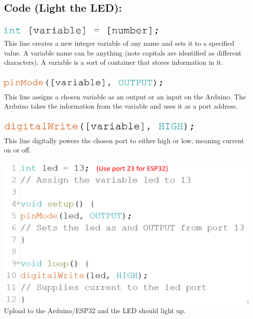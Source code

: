 \documentclass[a4paper,12pt]{report}
\newcommand{\diagramWidth}{150mm}
\newcommand{\codeHeight}{7mm}
\begin{document}
\subsection*{Code (Light the LED):}
    \begin{mdframed}[linewidth = 3, linecolor = turbo_purple]
        \includegraphics[height = \codeHeight]{Assets/int.png} \\
        This line creates a new integer variable of any name and sets it to a specified value. A variable name can be anything (note capitals are identified as different characters). A variable is a sort of container that stores information in it. \\ \\
        \includegraphics[height = \codeHeight]{Assets/pinmode.png} \\
        This line assigns a chosen variable as an output or an input on the Arduino. The Arduino takes the information from the variable and uses it as a port address. \\ \\
        \includegraphics[height = \codeHeight]{Assets/dwrite.png} \\
        This line digitally powers the chosen port to either high or low,  meaning current on or off.
    \end{mdframed} 
    \vspace{20mm}
    \includegraphics[width = \diagramWidth]{Assets/Light_led.png} \\
    Upload to the Arduino/ESP32 and the LED should light up.
\end{document}
